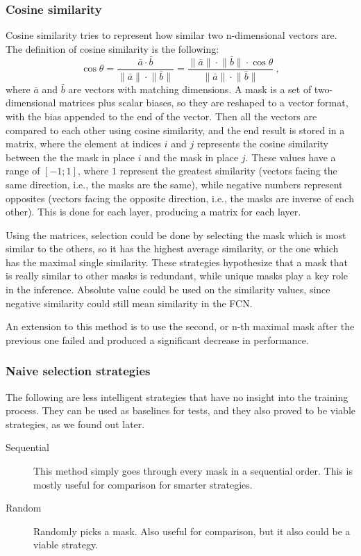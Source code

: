 \documentclass[12pt]{report}
\begin{document}
\subsubsection{Cosine similarity}Cosine similarity  tries to represent how similar two n-dimensional vectors are. The definition of cosine similarity is the following:
\begin{equation*}
\cos{\theta} = \dfrac{\bar{a}\cdot\bar{b}}{\lVert\bar{a}\rVert\cdot\lVert\bar{b}\rVert} = \dfrac{\lVert\bar{a}\rVert\cdot\lVert\bar{b}\rVert\cdot\cos{\theta}}{\lVert\bar{a}\rVert\cdot\lVert\bar{b}\rVert}\ ,
\end{equation*}
where $\bar{a}$ and $\bar{b}$ are vectors with matching dimensions. A mask is a set of two-dimensional matrices plus scalar biases, so they are reshaped to a vector format, with the bias appended to the end of the vector. Then all the vectors are compared to each other using cosine similarity, and the end result is stored in a matrix, where the element at indices $i$ and $j$ represents the cosine similarity between the the mask in place $i$ and the mask in place $j$. These values have a range of $\left[-1;1\right] $, where $1$ represent the greatest similarity (vectors facing the same direction, i.e., the masks are the same), while negative numbers represent opposites (vectors facing the opposite direction, i.e., the masks are inverse of each other). This is done for each layer, producing a matrix for each layer.

Using the matrices, selection could be done by selecting the mask which is most similar to the others, so it has the highest average similarity, or the one which has the maximal single similarity. These strategies hypothesize that a mask that is really similar to other masks is redundant, while unique masks play a key role in the inference. Absolute value could be used on the similarity values, since negative similarity could still mean similarity in the FCN.

An extension to this method is to use the second, or n-th maximal mask after the previous one failed and produced a significant decrease in performance.
\subsubsection{Naive selection strategies}
The following are less intelligent strategies that have no insight into the training process. They can be used as baselines for tests, and they also proved to be viable strategies, as we found out later.
\begin{description}
	\item[Sequential] This method simply goes through every mask in a sequential order. This is mostly useful for comparison for smarter strategies.
	\item[Random] Randomly picks a mask. Also useful for comparison, but it also could be a viable strategy.
\end{description}
\end{document}
